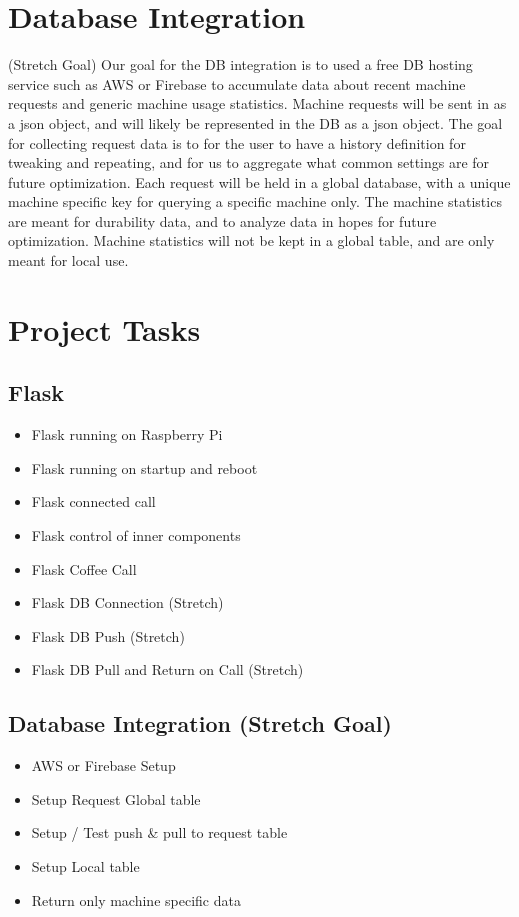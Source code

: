\documentclass[conference]{IEEEtran}
\begin{document}
\begin{itemize}
\section{Database Integration}
(Stretch Goal) Our goal for the DB integration is to used a free DB hosting service such as AWS or Firebase
to accumulate data about recent machine requests and generic machine usage statistics. Machine requests will
be sent in as a json object, and will likely be represented in the DB as a json object. The goal for collecting request
data is to for the user to have a history definition for tweaking and repeating, and for us to aggregate what common 
settings are for future optimization. Each request will be held in a global database, with a unique machine specific
key for querying a specific machine only. The machine statistics are meant for durability data, and to analyze data in hopes for future optimization.
Machine statistics will not be kept in a global table, and are only meant for local use.

\section{Project Tasks}
\subsection{Flask}
\begin{itemize}
\item Flask running on Raspberry Pi
\item Flask running on startup and reboot
\item Flask connected call
\item Flask control of inner components
\item Flask Coffee Call
\item Flask DB Connection (Stretch)
\item Flask DB Push (Stretch)
\item Flask DB Pull and Return on Call (Stretch)
\end{itemize}
\subsection{Database Integration (Stretch Goal)}
\begin{itemize}
\item AWS or Firebase Setup
\item Setup Request Global table
\item Setup / Test push \& pull to request table
\item Setup Local table
\item Return only machine specific data
\end{itemize}



\end{itemize}
\end{document}
